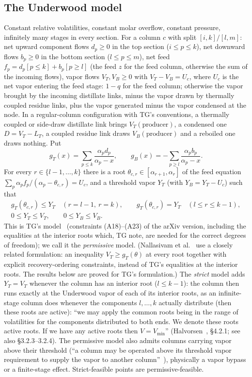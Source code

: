 \documentclass[11pt,a4paper]{report}
\begin{document}
\subsection{The Underwood model}\label{sec:model}
Constant relative volatilities, constant molar overflow, constant pressure, infinitely many stages in every section.
For a column $c$ with split $[i,k]/[l,m]$: net upward component flows $d_p\ge0$ in the top section ($i\le p\le k$), net
downward flows $b_p\ge0$ in the bottom section ($l\le p\le m$), net feed $f_p=d_p[p\le k]+b_p[p\ge l]$ (the feed $z$ for
the feed column, otherwise the sum of the incoming flows), vapor flows $V_T,V_B\ge0$ with $V_T-V_B=U_c$, where $U_c$ is
the net vapor entering the feed stage: $1-q$ for the feed column; otherwise the vapor brought by the incoming
distillate links, minus the vapor drawn by thermally coupled residue links, plus the vapor generated minus the vapor
condensed at the node. In a regular-column configuration with TG's conventions, a thermally coupled or side-draw
distillate link brings $V_T(\text{producer})$, a condensed one $D=V_T-L_T$, a coupled residue link draws
$V_B(\text{producer})$ and a reboiled one draws nothing. Put
\[g_T(x)=\sum_{p\le k}\frac{\alpha_pd_p}{\alpha_p-x},\qquad g_B(x)=-\sum_{p\ge l}\frac{\alpha_pb_p}{\alpha_p-x}.\]
For every $r\in\{l-1,\dots,k\}$ there is a root $\theta_{c,r}\in[\alpha_{r+1},\alpha_r]$ of the feed equation
$\sum_p\alpha_pf_p/(\alpha_p-\theta_{c,r})=U_c$, and a threshold vapor $Y_T$ (with $Y_B=Y_T-U_c$) such that
\begin{equation}\label{eq:TG}
\begin{gathered}
g_T(\theta_{c,r})\le Y_T\quad(r=l-1,\ r=k),\qquad g_T(\theta_{c,r})=Y_T\quad(l\le r\le k-1),\\
0\le Y_T\le V_T,\qquad 0\le Y_B\le V_B .
\end{gathered}
\end{equation}
This is TG's model~\autocite{TGAT} (constraints (A18)--(A23) of the arXiv version, including the equalities at the
interior roots which, TG note, are needed for the correct degrees of freedom); we call it the \emph{permissive} model.
(Nallasivam et al.~\autocite{Nallasivam2016} use a closely related formulation: an inequality $V_T\ge g_T(\theta)$ at
every root together with explicit recovery-ordering constraints, instead of TG's equalities at the interior roots.
The results below are proved for TG's formulation.) The \emph{strict} model adds $Y_T=V_T$ whenever the column has an interior root
($l\le k-1$): the column then runs exactly at the Underwood vapor of each of its interior roots, as an infinite-stage
column does whenever the components $l,\dots,k$ actually distribute (then these roots are active): ``we may apply the common roots being in the range of volatilities for the
components distributed to both ends. We denote these roots active roots. If we have any active roots then
$V=V_{\min}$'' (Halvorsen~\autocite{HalvorsenThesis}, \S4.2.1; see also \S3.2.3--3.2.4). The permissive model also admits columns carrying vapor above their threshold (``a column may be operated
above its threshold vapor requirement to supply the vapor to another column''~\autocite{TGAT}), physically a vapor
bypass or a finite-stage effect. Strict-feasible points are permissive-feasible.
\end{document}
